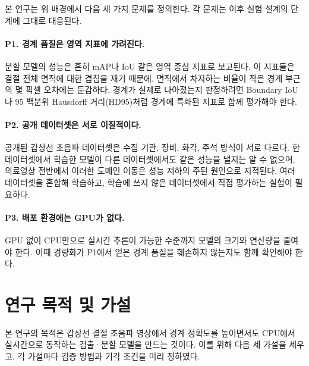 본 연구는 위 배경에서 다음 세 가지 문제를 정의한다. 각 문제는 이후 실험 설계의 단계에 그대로
대응된다.

\paragraph{P1. 경계 품질은 영역 지표에 가려진다.}
분할 모델의 성능은 흔히 mAP나 IoU 같은 영역 중심 지표로 보고된다. 이 지표들은 결절 전체 면적에
대한 겹침을 재기 때문에, 면적에서 차지하는 비율이 작은 경계 부근의 몇 픽셀 오차에는 둔감하다.
경계가 실제로 나아졌는지 판정하려면 Boundary IoU\citep{cheng2021boundaryiou}나 95 백분위
Hausdorff 거리(HD95)\citep{taha2015metrics}처럼 경계에 특화된 지표로 함께 평가해야 한다.

\paragraph{P2. 공개 데이터셋은 서로 이질적이다.}
공개된 갑상선 초음파 데이터셋은 수집 기관, 장비, 화각, 주석 방식이 서로 다르다. 한 데이터셋에서
학습한 모델이 다른 데이터셋에서도 같은 성능을 낼지는 알 수 없으며, 의료영상 전반에서 이러한
도메인 이동은 성능 저하의 주된 원인으로 지적된다\citep{guan2022domain}. 여러 데이터셋을 혼합해
학습하고, 학습에 쓰지 않은 데이터셋에서 직접 평가하는 실험이 필요하다.

\paragraph{P3. 배포 환경에는 GPU가 없다.}
GPU 없이 CPU만으로 실시간 추론이 가능한 수준까지 모델의 크기와 연산량을 줄여야 한다.
이때 경량화가 P1에서 얻은 경계 품질을 훼손하지 않는지도 함께 확인해야 한다.

\section{연구 목적 및 가설}\label{sec:hypothesis}

본 연구의 목적은 갑상선 결절 초음파 영상에서 경계 정확도를 높이면서도 CPU에서 실시간으로
동작하는 검출·분할 모델을 만드는 것이다. 이를 위해 다음 세 가설을 세우고, 각 가설마다 검증 방법과
기각 조건을 미리 정하였다.

